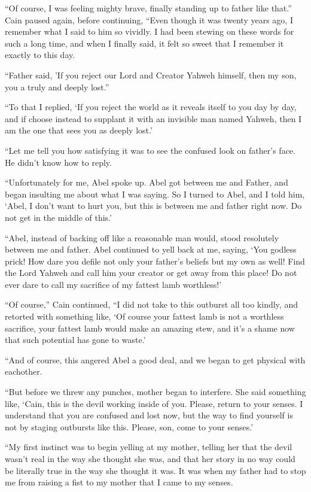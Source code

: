 \documentclass[12pt,twoside,titlepage]{report}
\begin{document}
``Of course, I was feeling mighty brave, finally standing up to father
like that.'' Cain paused again, before continuing, ``Even though it was
twenty years ago, I remember what I said to him so vividly. I had been
stewing on these words for such a long time, and when I finally said, it
felt so sweet that I remember it exactly to this day.

``Father said, 'If you reject our Lord and Creator Yahweh himself, then
my son, you a truly and deeply lost.''

``To that I replied, `If you reject the world as it reveals itself to
you day by day, and if choose instead to supplant it with an invisible
man named Yahweh, then I am the one that sees you as deeply lost.'

``Let me tell you how satisfying it was to see the confused look on
father's face. He didn't know how to reply.

``Unfortunately for me, Abel spoke up. Abel got between me and Father,
and began insulting me about what I was saying. So I turned to Abel, and
I told him, `Abel, I don't want to hurt you, but this is between me and
father right now. Do not get in the middle of this.'

``Abel, instead of backing off like a reasonable man would, stood
resolutely between me and father. Abel continued to yell back at me,
saying, `You godless prick! How dare you defile not only your father's
beliefs but my own as well! Find the Lord Yahweh and call him your
creator or get away from this place! Do not ever dare to call my
sacrifice of my fattest lamb worthless!'

``Of course,'' Cain continued, ``I did not take to this outburst all too
kindly, and retorted with something like, `Of course your fattest lamb
is not a worthless sacrifice, your fattest lamb would make an amazing
stew, and it's a shame now that such potential has gone to waste.'

``And of course, this angered Abel a good deal, and we began to get
physical with eachother.

``But before we threw any punches, mother began to interfere. She said
something like, `Cain, this is the devil working inside of you. Please,
return to your senses. I understand that you are confused and lost now,
but the way to find yourself is not by staging outbursts like this.
Please, son, come to your senses.'

``My first instinct was to begin yelling at my mother, telling her that
the devil wasn't real in the way she thought she was, and that her story
in no way could be literally true in the way she thought it was. It was
when my father had to stop me from raising a fist to my mother that I
came to my senses.
\end{document}
